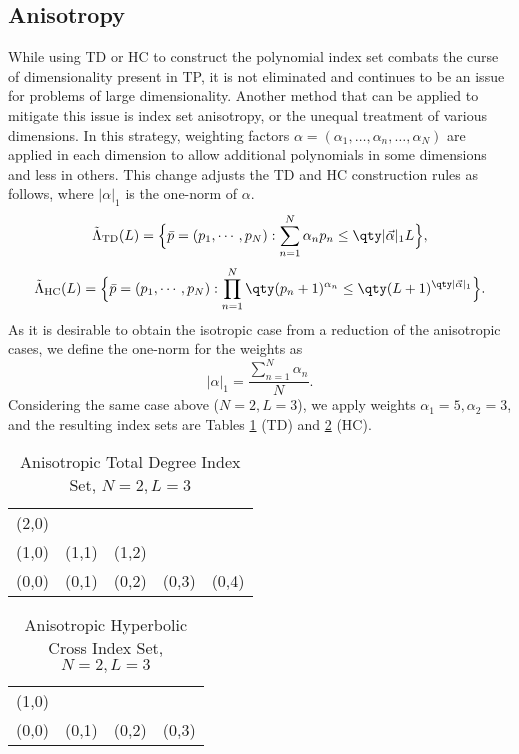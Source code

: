 \subsection{Anisotropy}
While using TD or HC to construct the polynomial index set combats the curse of dimensionality present in TP,
it is not eliminated and continues to be an issue for problems of large dimensionality.  Another method that can
be applied to mitigate this issue is index set anisotropy, or the unequal treatment of various dimensions.
In this strategy, weighting factors $\alpha=(\alpha_1,\ldots,\alpha_n,\ldots,\alpha_N)$ are applied in each
dimension to allow additional polynomials in some dimensions and less in others.  This change adjusts the TD
and HC construction rules as follows, where $|\alpha|_1$ is the one-norm of $\alpha$.
\begin{equation}
  \tilde\Lambda_\text{TD}(L)=\Big\{\bar p=(p_1,\cdots,p_N):\sum_{n=1}^N \alpha_n p_n \leq \qty|\vec\alpha|_1 L
\Big\},
\end{equation}
\begin{equation}
  \tilde\Lambda_\text{HC}(L)=\Big\{\bar p=(p_1,\cdots,p_N):\prod_{n=1}^N \qty(p_n+1)^{\alpha_n} \leq
  \qty(L+1)^{\qty|\vec\alpha|_1} \Big\}.
\end{equation}
As it is desirable to obtain the isotropic case from a reduction of the anisotropic cases, we define the
one-norm for the weights as
\begin{equation}
  |\alpha|_1 = \frac{\sum_{n=1}^N \alpha_n}{N}.
\end{equation}
Considering the same case above ($N=2,L=3$), we apply weights $\alpha_1=5,\alpha_2=3$, and the resulting index
sets are Tables \ref{tab:aniTD} (TD) and \ref{tab:aniHC} (HC).

\begin{table}[h]
  \centering
  \begin{tabular}{c c c c c}
    (2,0) &       &       &       & \\
    (1,0) & (1,1) & (1,2) &       & \\
    (0,0) & (0,1) & (0,2) & (0,3) & (0,4)
  \end{tabular}
  \caption{Anisotropic Total Degree Index Set, $N=2,L=3$}
  \label{tab:aniTD}
\end{table}

\begin{table}[h]
  \centering
  \begin{tabular}{c c c c}
    (1,0) &       &       &       \\
    (0,0) & (0,1) & (0,2) & (0,3)
  \end{tabular}
  \caption{Anisotropic Hyperbolic Cross Index Set, $N=2,L=3$}
  \label{tab:aniHC}
\end{table}

